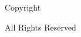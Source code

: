 \centerline{Copyright \utdgraduationyear}
\centerline{\utdauthortitlecase}
\centerline{All Rights Reserved}
